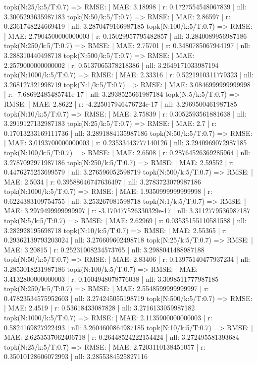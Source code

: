 topk(N:25/k:5/T:0.7) => RMSE: | MAE: 3.18998 | r: 0.1727554548067839 | nll: 3.3005293635987183
topk(N:50/k:5/T:0.7) => RMSE: | MAE: 2.86597 | r: 0.2361748224669419 | nll: 3.2870479166987185
topk(N:100/k:5/T:0.7) => RMSE: | MAE: 2.7904500000000003 | r: 0.15029957795482857 | nll: 3.2840089956987186
topk(N:250/k:5/T:0.7) => RMSE: | MAE: 2.75701 | r: 0.3480785067944197 | nll: 3.288310440498718
topk(N:500/k:5/T:0.7) => RMSE: | MAE: 2.2579000000000002 | r: 0.5137065378218386 | nll: 3.2649171033987194
topk(N:1000/k:5/T:0.7) => RMSE: | MAE: 2.33316 | r: 0.5221910311779323 | nll: 3.268127321998719
topk(N:1/k:5/T:0.7) => RMSE: | MAE: 3.0846999999999998 | r: -7.68692485485741e-17 | nll: 3.2938525661987184
topk(N:5/k:5/T:0.7) => RMSE: | MAE: 2.8622 | r: -4.225017946476724e-17 | nll: 3.2969500461987185
topk(N:10/k:5/T:0.7) => RMSE: | MAE: 2.75839 | r: 0.3052593561881638 | nll: 3.2919127132987183
topk(N:25/k:5/T:0.7) => RMSE: | MAE: 2.7 | r: 0.17013233169111736 | nll: 3.2891884135987186
topk(N:50/k:5/T:0.7) => RMSE: | MAE: 3.0193700000000003 | r: 0.23533443777140126 | nll: 3.2940969072987185
topk(N:100/k:5/T:0.7) => RMSE: | MAE: 2.6508 | r: 0.28764526369285964 | nll: 3.2787092971987186
topk(N:250/k:5/T:0.7) => RMSE: | MAE: 2.59552 | r: 0.4476275253699579 | nll: 3.276596052598719
topk(N:500/k:5/T:0.7) => RMSE: | MAE: 2.5034 | r: 0.39588646747636497 | nll: 3.2783723079987186
topk(N:1000/k:5/T:0.7) => RMSE: | MAE: 1.9350999999999998 | r: 0.6224383109754755 | nll: 3.253267081598718
topk(N:1/k:5/T:0.7) => RMSE: | MAE: 3.2979499999999997 | r: -3.170477526330329e-17 | nll: 3.3112779536987187
topk(N:5/k:5/T:0.7) => RMSE: | MAE: 2.62969 | r: 0.03535155110581588 | nll: 3.282928195698718
topk(N:10/k:5/T:0.7) => RMSE: | MAE: 2.55365 | r: 0.29362139793203024 | nll: 3.276609602498718
topk(N:25/k:5/T:0.7) => RMSE: | MAE: 3.20815 | r: 0.25231008234573765 | nll: 3.2988041488987188
topk(N:50/k:5/T:0.7) => RMSE: | MAE: 2.83406 | r: 0.13975140477937234 | nll: 3.2853018231987186
topk(N:100/k:5/T:0.7) => RMSE: | MAE: 3.4132800000000003 | r: 0.1604948078776038 | nll: 3.3098511777987185
topk(N:250/k:5/T:0.7) => RMSE: | MAE: 2.5548599999999997 | r: 0.47823534575952603 | nll: 3.274245055198719
topk(N:500/k:5/T:0.7) => RMSE: | MAE: 2.4519 | r: 0.53618433087828 | nll: 3.2716133059987182
topk(N:1000/k:5/T:0.7) => RMSE: | MAE: 2.1135900000000003 | r: 0.5824169827922493 | nll: 3.2604600864987185
topk(N:10/k:5/T:0.7) => RMSE: | MAE: 2.6253537062406718 | r: 0.26448524222154424 | nll: 3.272495581393684
topk(N:25/k:5/T:0.7) => RMSE: | MAE: 2.7203110138451057 | r: 0.35010128606072993 | nll: 3.2855384525827116
